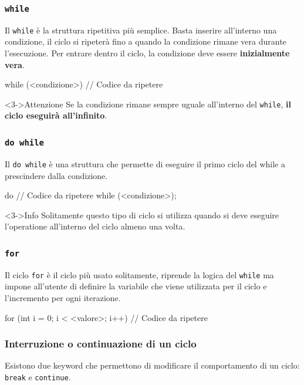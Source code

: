 \documentclass[handout]{beamer}
\begin{document}
    \begin{frame}[fragile]
        \frametitle{\texttt{while}}
        Il \texttt{while} è la struttura ripetitiva più semplice. Basta inserire all'interno una condizione, il ciclo si ripeterà fino a quando la condizione rimane vera durante l'esecuzione. Per entrare dentro il ciclo, la condizione deve essere \textbf{inizialmente vera}.
        \begin{cppcode}
            while (<condizione>) {
                // Codice da ripetere
            }
        \end{cppcode}
        \begin{alertblock}<3->{Attenzione}
            Se la condizione rimane sempre uguale all'interno del \texttt{while}, \textbf{il ciclo eseguirà all'infinito}.
        \end{alertblock}
    \end{frame}

    \begin{frame}[fragile]
        \frametitle{\texttt{do while}}
        Il \texttt{do while} è una struttura che permette di eseguire il primo ciclo del while a prescindere dalla condizione.
        \begin{cppcode}
            do {
                // Codice da ripetere
            } while (<condizione>);
        \end{cppcode}
        \begin{block}<3->{Info}
            Solitamente questo tipo di ciclo si utilizza quando si deve eseguire l'operatione all'interno del ciclo almeno una volta. 
        \end{block}
    \end{frame}

    \begin{frame}[fragile]
        \frametitle{\texttt{for}}
        Il ciclo \texttt{for} è il ciclo più usato solitamente, riprende la logica del \texttt{while} ma impone all'utente di definire la variabile che viene utilizzata per il ciclo e l'incremento per ogni iterazione.
        \begin{cppcode}
            for (int i = 0; i < <valore>; i++) {
                // Codice da ripetere
            }
        \end{cppcode}
    \end{frame}

    \begin{frame}[fragile]
        \frametitle{Interruzione o continuazione di un ciclo}
        Esistono due keyword che permettono di modificare il comportamento di un ciclo: \texttt{break} e \texttt{continue}.
    \end{frame}
\end{document}
